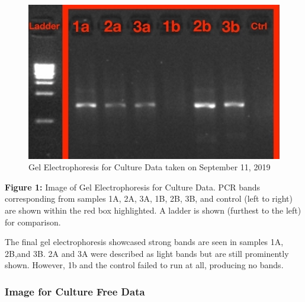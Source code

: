 \documentclass[]{article}
\begin{document}
\begin{figure}
\centering
\includegraphics{data/images/gel_images/2019-09-18_Culture_PCRs_BIOL422_Zimmerman_.jpg}
\caption{Gel Electrophoresis for Culture Data taken on September 11,
2019}
\end{figure}

\textbf{Figure 1:} Image of Gel Electrophoresis for Culture Data. PCR
bands corresponding from samples 1A, 2A, 3A, 1B, 2B, 3B, and control
(left to right) are shown within the red box highlighted. A ladder is
shown (furthest to the left) for comparison.

The final gel electrophoresis showcased strong bands are seen in samples
1A, 2B,and 3B. 2A and 3A were described as light bands but are still
prominently shown. However, 1b and the control failed to run at all,
producing no bands.

\hypertarget{image-for-culture-free-data}{%
\subsubsection{Image for Culture Free
Data}\label{image-for-culture-free-data}}
\end{document}
